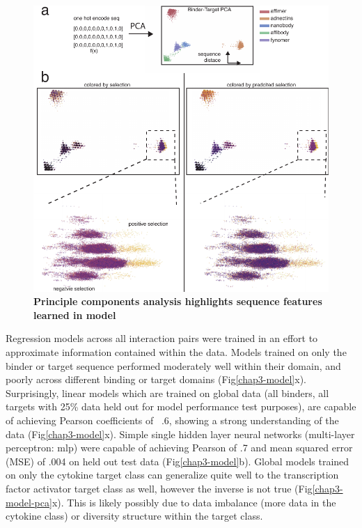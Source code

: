 \begin{figure}
\includegraphics[width=\textwidth]{figures/chapter3/20190621_fig8b_model_pca.pdf}
\caption[Principle components analysis highlights sequence features learned in model]{\textbf{Principle components analysis highlights sequence features learned in model}
\label{chap3-pca}}
\end{figure}
Regression models across all interaction pairs were trained in an effort to approximate information contained within the data. Models trained on only the binder or target sequence performed moderately well within their domain, and poorly across different binding or target domains (Fig\ref{chap3-model}x). Surprisingly, linear models which are trained on global data (all binders, all targets with 25\% data held out for model performance test purposes), are capable of achieving Pearson coefficients of ~.6, showing a strong understanding of the data (Fig\ref{chap3-model}x). Simple single hidden layer neural networks (multi-layer perceptron: mlp)  were capable of achieving Pearson of .7 and mean squared error (MSE) of .004 on held out test data (Fig\ref{chap3-model}b). Global models trained on only the cytokine target class can generalize quite well to the transcription factor activator target class as well, however the inverse is not true (Fig\ref{chap3-model-pca}x). This is likely possibly due to data imbalance (more data in the cytokine class) or diversity structure within the target class. 

